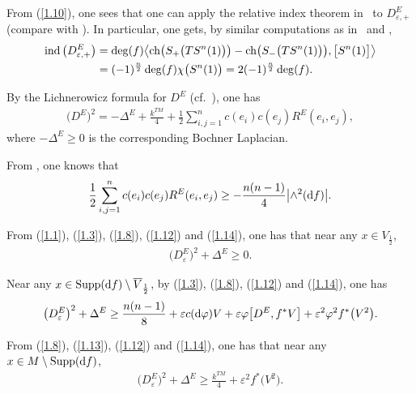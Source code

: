 \documentclass[pdftex]{sigma}
\numberwithin{equation}{section}
\theoremstyle{definition}
\begin{document}
 From (\ref{1.10}), one sees that one can apply the relative index theorem in~\cite{GL83} to $D^E_{\varepsilon,+}$ (compare with \cite[Section~6$\frac{4}{5}$]{Gr96}). In particular, one gets, by similar computations as in~\cite{GL83} and \cite[Proposition~III.11.24]{LaMi89},
\begin{align}
\operatorname{ind}\big(D^E_{\varepsilon,+}\big)
&= \deg (f)\big\langle {\rm ch}\big(S_+\big(TS^n(1)\big)\big) -
 {\rm ch}\big(S_-\big(TS^n(1)\big)\big),\big[S^n(1)\big]\big\rangle
\nonumber\\
& =(-1)^{\frac{n}{2}}\deg (f) \chi\big(S^n(1)\big)
 =2(-1)^{\frac{n}{2}}\deg (f) .\label{1.11}
\end{align}

 By the Lichnerowicz formula \cite{L63} for $D^E$ (cf.~\cite{LaMi89}), one has
\begin{gather}\label{1.12}
\big(D^E\big)^2=-\Delta^E+\frac{k^{TM}}{4}+\frac{1}{2}\sum_{i, j=1}^n c (e_i )c (e_j )R^E (e_i,e_j ) ,
\end{gather}
where $-\Delta^E\geq 0$ is the corresponding Bochner Laplacian.

From \cite[equation~(4.6)]{L98}, one knows that
\begin{gather}\label{1.14}
\frac{1}{2}\sum_{i, j=1}^n c (e_i )c (e_j )R^E (e_i,e_j )\geq -\frac{n(n-1)}{4}\big|{\wedge}^2({\rm d}f)\big|.
\end{gather}

From (\ref{1.1}), (\ref{1.3}), (\ref{1.8}), (\ref{1.12}) and (\ref{1.14}), one has that near any $x\in V_{\frac{1}{2}}$,
\begin{gather}\label{1.15}
\big(D_\varepsilon^E\big)^2+\Delta^E \geq0.
\end{gather}

Near any $x\in \operatorname{Supp}({\rm d}f)\setminus \overline{V}_{\frac{1}{2}}$, by
(\ref{1.3}), (\ref{1.8}), (\ref{1.12}) and (\ref{1.14}), one has
\begin{gather}\label{1.16}
\big(D_\varepsilon^E\big)^2+\Delta^E \geq \frac{n(n-1)}{8}+\varepsilon c({\rm d}\varphi)V+\varepsilon \varphi \big[D^E,f^*V\big]+\varepsilon^2\varphi^2f^*\big(V^2\big).
\end{gather}

From (\ref{1.8}), (\ref{1.13}), (\ref{1.12}) and (\ref{1.14}), one has that near any $x\in M\setminus \operatorname{Supp}({\rm d}f)$,
\begin{gather}\label{1.18}
\big(D_\varepsilon^E\big)^2+\Delta^E \geq \frac{k^{TM}}{4}+\varepsilon^2f^*\big(V^2\big).
\end{gather}
\end{document}
